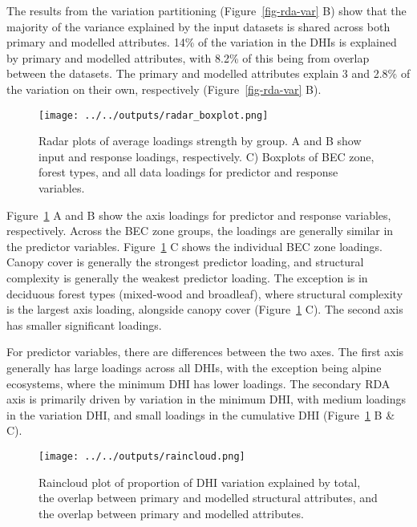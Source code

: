 \documentclass[
  authoryear,
  review,
  3p,
  twocolumn]{elsarticle}
\begin{document}
The results from the variation partitioning (Figure~\ref{fig-rda-var} B)
show that the majority of the variance explained by the input datasets
is shared across both primary and modelled attributes. 14\% of the
variation in the DHIs is explained by primary and modelled attributes,
with 8.2\% of this being from overlap between the datasets. The primary
and modelled attributes explain 3 and 2.8\% of the variation on their
own, respectively (Figure~\ref{fig-rda-var} B).

\begin{figure}

{\centering \texttt{[image: ../../outputs/radar\_boxplot.png]}

}

\caption{\label{fig-radar}Radar plots of average loadings strength by
group. A and B show input and response loadings, respectively. C)
Boxplots of BEC zone, forest types, and all data loadings for predictor
and response variables.}

\end{figure}

Figure~\ref{fig-radar} A and B show the axis loadings for predictor and
response variables, respectively. Across the BEC zone groups, the
loadings are generally similar in the predictor variables.
Figure~\ref{fig-radar} C shows the individual BEC zone loadings. Canopy
cover is generally the strongest predictor loading, and structural
complexity is generally the weakest predictor loading. The exception is
in deciduous forest types (mixed-wood and broadleaf), where structural
complexity is the largest axis loading, alongside canopy cover
(Figure~\ref{fig-radar} C). The second axis has smaller significant
loadings.

For predictor variables, there are differences between the two axes. The
first axis generally has large loadings across all DHIs, with the
exception being alpine ecosystems, where the minimum DHI has lower
loadings. The secondary RDA axis is primarily driven by variation in the
minimum DHI, with medium loadings in the variation DHI, and small
loadings in the cumulative DHI (Figure~\ref{fig-radar} B \& C).

\begin{figure}

{\centering \texttt{[image: ../../outputs/raincloud.png]}

}

\caption{\label{fig-raincloud}Raincloud plot of proportion of DHI
variation explained by total, the overlap between primary and modelled
structural attributes, and the overlap between primary and modelled
attributes.}

\end{figure}
\end{document}
